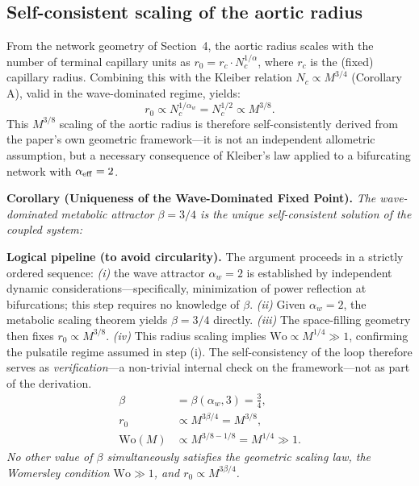 \documentclass[11pt,a4paper]{article}
\theoremstyle{remark}
\begin{document}
\subsection{Self-consistent scaling of the aortic radius}

From the network geometry of Section~4, the aortic radius scales with the number
of terminal capillary units as $r_0 = r_c \cdot N_c^{1/\alpha}$, where $r_c$ is
the (fixed) capillary radius. Combining this with the Kleiber relation $N_c
\propto M^{3/4}$ (Corollary A), valid in the wave-dominated regime, yields:
\begin{equation}
r_0 \propto N_c^{1/\alpha_w} = N_c^{1/2} \propto M^{3/8}.
\end{equation}
This $M^{3/8}$ scaling of the aortic radius is therefore self-consistently
derived from the paper's own geometric framework---it is not an independent
allometric assumption, but a necessary consequence of Kleiber's law applied to a
bifurcating network with $\alpha_{\rm eff} = 2$.

\vspace{0.4em}
\noindent\textbf{Corollary (Uniqueness of the Wave-Dominated Fixed Point).}
\textit{The wave-dominated metabolic attractor $\beta = 3/4$ is the unique self-consistent solution of the coupled system:}

\noindent\textbf{Logical pipeline (to avoid circularity).} The argument proceeds in a strictly ordered sequence: \textit{(i)} the wave attractor $\alpha_w = 2$ is established by independent dynamic considerations---specifically, minimization of power reflection at bifurcations; this step requires no knowledge of $\beta$. \textit{(ii)} Given $\alpha_w = 2$, the metabolic scaling theorem yields $\beta = 3/4$ directly. \textit{(iii)} The space-filling geometry then fixes $r_0 \propto M^{3/8}$. \textit{(iv)} This radius scaling implies $\mathrm{Wo} \propto M^{1/4} \gg 1$, confirming the pulsatile regime assumed in step (i). The self-consistency of the loop therefore serves as \emph{verification}---a non-trivial internal check on the framework---not as part of the derivation.
\begin{align}
\beta &= \beta(\alpha_w, 3) = \frac{3}{4}, \label{eq:fp1}\\
r_0 &\propto M^{3\beta/4} = M^{3/8}, \label{eq:fp2}\\
\mathrm{Wo}(M) &\propto M^{3/8 - 1/8} = M^{1/4} \gg 1. \label{eq:fp3}
\end{align}
\textit{No other value of $\beta$ simultaneously satisfies the geometric scaling law, the Womersley condition $\mathrm{Wo} \gg 1$, and $r_0 \propto M^{3\beta/4}$.}
\end{document}
